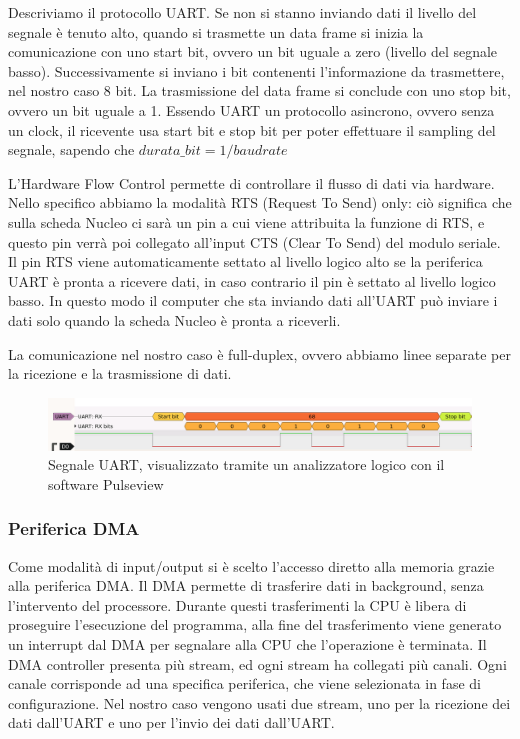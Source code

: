 Descriviamo il protocollo UART. Se non si stanno inviando dati il livello del segnale è tenuto alto, quando si trasmette un data frame si inizia la comunicazione con uno start bit, ovvero un bit uguale a zero (livello del segnale basso). Successivamente si inviano i bit contenenti l'informazione da trasmettere, nel nostro caso 8 bit. La trasmissione del data frame si conclude con uno stop bit, ovvero un bit uguale a 1. Essendo UART un protocollo asincrono, ovvero senza un clock, il ricevente usa start bit e stop bit per poter effettuare il sampling del segnale, sapendo che $durata\_bit = 1/baud rate$

L'Hardware Flow Control permette di controllare il flusso di dati via hardware. Nello specifico abbiamo la modalità RTS (Request To Send) only: ciò significa che sulla scheda Nucleo ci sarà un pin a cui viene attribuita la funzione di RTS, e questo pin verrà poi collegato all'input CTS (Clear To Send) del modulo seriale. Il pin RTS viene automaticamente settato al livello logico alto se la periferica UART è pronta a ricevere dati, in caso contrario il pin è settato al livello logico basso. In questo modo il computer che sta inviando dati all'UART può inviare i dati solo quando la scheda Nucleo è pronta a riceverli.

La comunicazione nel nostro caso è full-duplex, ovvero abbiamo linee separate per la ricezione e la trasmissione di dati.

\begin{figure}[htb]
    \centering
    \includegraphics[width=\textwidth]{images/uart_protocol.png}
    \caption{Segnale UART, visualizzato tramite un analizzatore logico con il software Pulseview}
    \label{fig:uart_protocol}
\end{figure}

\subsubsection{Periferica DMA}
Come modalità di input/output si è scelto l'accesso diretto alla memoria grazie alla periferica DMA.
Il DMA permette di trasferire dati in background, senza l'intervento del processore. Durante questi trasferimenti la CPU è libera di proseguire l'esecuzione del programma, alla fine del trasferimento viene generato un interrupt dal DMA per segnalare alla CPU che l'operazione è terminata.
Il DMA controller presenta più stream, ed ogni stream ha collegati più canali. Ogni canale corrisponde ad una specifica periferica, che viene selezionata in fase di configurazione.
Nel nostro caso vengono usati due stream, uno per la ricezione dei dati dall'UART e uno per l'invio dei dati dall'UART.

